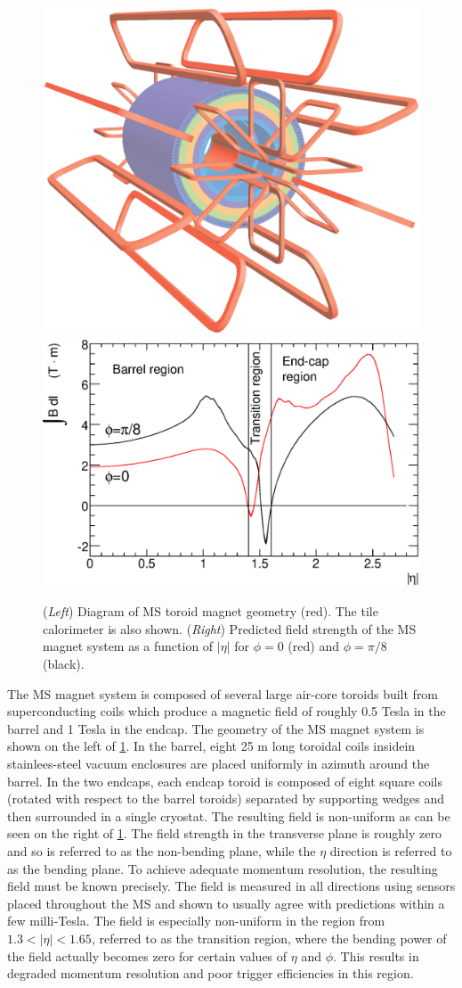 \begin{figure}[ht]
\centering
\includegraphics[width=.45\textwidth]{figures/atlas/magnet}
\includegraphics[width=.45\textwidth]{figures/atlas/toroid_magnet_field}
\caption{(\emph{Left}) Diagram of MS toroid magnet geometry (red). The
tile calorimeter is also shown.
(\emph{Right}) Predicted field strength of the MS magnet 
system as a function of $|\eta|$
for $\phi=0$ (red) and $\phi=\pi/8$ (black).}
\label{fig:atlas_toroid_magnet}
\end{figure}


The MS magnet system is composed of several large air-core toroids built
from superconducting coils which produce a magnetic field of 
roughly 0.5 Tesla in the barrel and 1 Tesla in the endcap. 
The geometry of the MS magnet system is shown 
on the left of \fig\ref{fig:atlas_toroid_magnet}. In the barrel, 
eight 25 m long toroidal 
coils insidein stainlees-steel vacuum enclosures are placed uniformly in 
azimuth around the barrel. In the two endcaps, 
each endcap toroid is composed of 
eight square coils (rotated with respect to the barrel toroids)
separated by supporting wedges and then surrounded in a single 
cryostat.
The resulting field is non-uniform as can be seen on the right
of \fig\ref{fig:atlas_toroid_magnet}. 
The field strength in the transverse plane is roughly zero and so is referred
to as the non-bending plane, while the $\eta$ direction is referred to as the
bending plane.
To achieve adequate momentum resolution, the resulting field must be known
precisely.
The field is measured in all directions using sensors placed throughout
the MS and shown to usually agree with predictions within a few milli-Tesla.
The field is especially non-uniform in the region from 
$1.3 < |\eta| < 1.65$, referred to as the transition region, 
where the bending power of the field actually becomes zero
for certain values of $\eta$ and $\phi$.
This results in degraded momentum resolution and poor trigger efficiencies
in this region.


